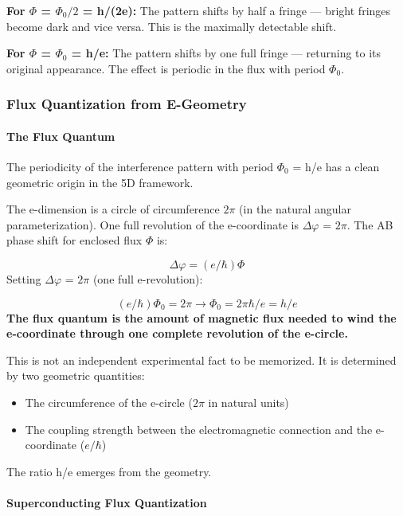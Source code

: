 \documentclass[aps,prd,preprint,superscriptaddress,longbibliography,floatfix]{revtex4-2}
\theoremstyle{remark}
\begin{document}
\textbf{For $\Phi$ = $\Phi_{0}/2$ = h/(2e):} The pattern shifts by half a fringe --- bright fringes become dark and vice versa. This is the maximally detectable shift.

\textbf{For $\Phi$ = $\Phi_{0}$ = h/e:} The pattern shifts by one full fringe --- returning to its original appearance. The effect is periodic in the flux with period $\Phi_{0}$.


\subsubsection{Flux Quantization from E-Geometry}


\paragraph{The Flux Quantum}

The periodicity of the interference pattern with period $\Phi_{0}$ = h/e has a clean geometric origin in the 5D framework.

The e-dimension is a circle of circumference $2\pi$ (in the natural angular parameterization). One full revolution of the e-coordinate is $\Delta\varphi$ = $2\pi$. The AB phase shift for enclosed flux $\Phi$ is:


\begin{equation}
    \Delta\varphi = (e/\hbar)\Phi
\end{equation}
Setting $\Delta\varphi$ = $2\pi$ (one full e-revolution):


\begin{equation}
    (e/\hbar)\Phi_{0} = 2\pi    \to    \Phi_{0} = 2\pi\hbar/e = h/e
\end{equation}
\textbf{The flux quantum is the amount of magnetic flux needed to wind the e-coordinate through one complete revolution of the e-circle.}

This is not an independent experimental fact to be memorized. It is determined by two geometric quantities:

\begin{itemize}
  \item The circumference of the e-circle ($2\pi$ in natural units)
  \item The coupling strength between the electromagnetic connection and the e-coordinate ($e/\hbar$)
\end{itemize}

The ratio h/e emerges from the geometry.


\paragraph{Superconducting Flux Quantization}
\end{document}
